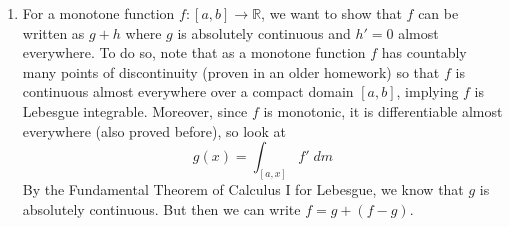 \documentclass[12pt]{article}
\theoremstyle{plain}
\theoremstyle{definition}
\theoremstyle{remark}
\begin{document}
\begin{enumerate}
\begin{enumerate}
\begin{enumerate}
\item For a monotone function $f:[a,b]\rightarrow\mathbb{R}$, we want to show that $f$ can be written as $g+h$ where $g$ is absolutely continuous and $h'=0$ almost everywhere. To do so, note that as a monotone function $f$ has countably many points of discontinuity (proven in an older homework) so that $f$ is continuous almost everywhere over a compact domain $[a,b]$, implying $f$ is Lebesgue integrable. Moreover, since $f$ is monotonic, it is differentiable almost everywhere (also proved before), so look at 
\[
    g(x) = \int_{[a,x]} f'\; dm 
\]
By the Fundamental Theorem of Calculus I for Lebesgue, we know that $g$ is absolutely continuous. But then we can write $f=g + (f-g)$. 






\end{enumerate} 


\end{enumerate} 


\end{enumerate} 
\end{document}
